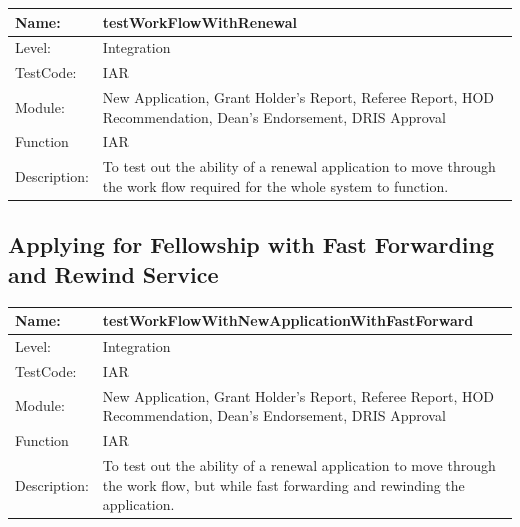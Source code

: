 \documentclass[12pt]{article}
\begin{document}
\begin{flushleft}
\begin{center}
\begin{tabular}{|l|p{12cm}|}
\hline
 Name: & testWorkFlowWithRenewal  \\
\hline
Level: & Integration \\
\hline
TestCode: & IAR \\
\hline
Module:&  New Application, Grant Holder's Report, Referee Report, HOD Recommendation, Dean's Endorsement, DRIS Approval\\
\hline
Function & IAR \\
\hline
Description: & To test out the ability of a renewal application to move through the work flow required for the whole system to function. \\
\hline
\end{tabular}
\end{center}


\subsection{Applying for Fellowship with Fast Forwarding and Rewind Service}

\begin{center}
\begin{tabular}{|l|p{12cm}|}
\hline
 Name: & testWorkFlowWithNewApplicationWithFastForward  \\
\hline
Level: & Integration \\
\hline
TestCode: & IAR \\
\hline
Module:&  New Application, Grant Holder's Report, Referee Report, HOD Recommendation, Dean's Endorsement, DRIS Approval\\
\hline
Function & IAR \\
\hline
Description: & To test out the ability of a renewal application to move through the work flow, but while fast forwarding and rewinding the application. \\
\hline
\end{tabular}
\end{center}


\end{flushleft}
\end{document}
